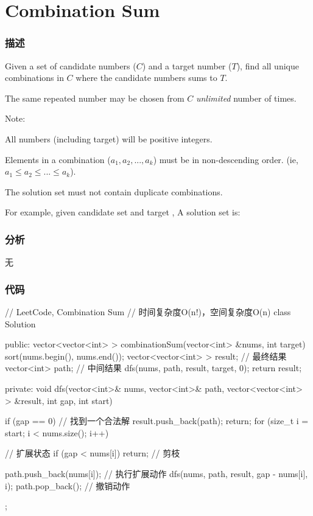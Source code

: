 \section{Combination Sum} %
\label{sec:combination-sum}


\subsubsection{描述}
Given a set of candidate numbers ($C$) and a target number ($T$), find all unique combinations in $C$ where the candidate numbers sums to $T$.

The same repeated number may be chosen from $C$ \emph{unlimited} number of times.

Note:
\begindot
\item All numbers (including target) will be positive integers.
\item Elements in a combination ($a_1, a_2, ..., a_k$) must be in non-descending order. (ie, $a_1 \leq a_2 \leq ... \leq a_k$).
\item The solution set must not contain duplicate combinations.
\myenddot

For example, given candidate set  and target , 
A solution set is: 
\begin{Code}
[7] 
[2, 2, 3] 
\end{Code}


\subsubsection{分析}
无


\subsubsection{代码}
\begin{Code}
// LeetCode, Combination Sum
// 时间复杂度O(n!)，空间复杂度O(n)
class Solution {
public:
    vector<vector<int> > combinationSum(vector<int> &nums, int target) {
        sort(nums.begin(), nums.end());
        vector<vector<int> > result; // 最终结果
        vector<int> path; // 中间结果
        dfs(nums, path, result, target, 0);
        return result;
    }

private:
    void dfs(vector<int>& nums, vector<int>& path, vector<vector<int> > &result,
            int gap, int start) {
        if (gap == 0) {  // 找到一个合法解
            result.push_back(path);
            return;
        }
        for (size_t i = start; i < nums.size(); i++) { // 扩展状态
            if (gap < nums[i]) return; // 剪枝

            path.push_back(nums[i]); // 执行扩展动作
            dfs(nums, path, result, gap - nums[i], i);
            path.pop_back();  // 撤销动作
        }
    }
};
\end{Code}


